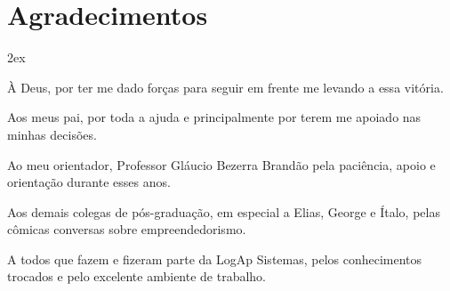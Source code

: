 \chapter*{Agradecimentos}
\thispagestyle{empty}

\begin{trivlist}  \itemsep 2ex

\item À Deus, por ter me dado forças para seguir em frente me levando a essa vitória.

\item Aos meus pai, por toda a ajuda e principalmente por terem me apoiado nas minhas decisões.

\item Ao meu orientador, Professor Gláucio Bezerra Brandão pela paciência, apoio e orientação durante esses anos.

\item Aos demais colegas de pós-graduação, em especial a Elias, George e Ítalo, pelas cômicas conversas sobre empreendedorismo.

\item A todos que fazem e fizeram parte da LogAp Sistemas, pelos conhecimentos trocados e pelo excelente ambiente de trabalho.

\end{trivlist}
